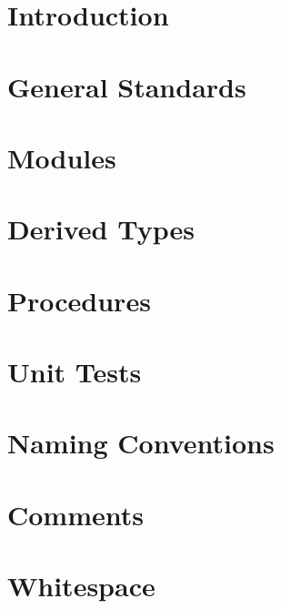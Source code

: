 \section{Introduction}

\section{General Standards}

\section{Modules}

\section{Derived Types}

\section{Procedures}

\section{Unit Tests}

\section{Naming Conventions}

\section{Comments}

\section{Whitespace}